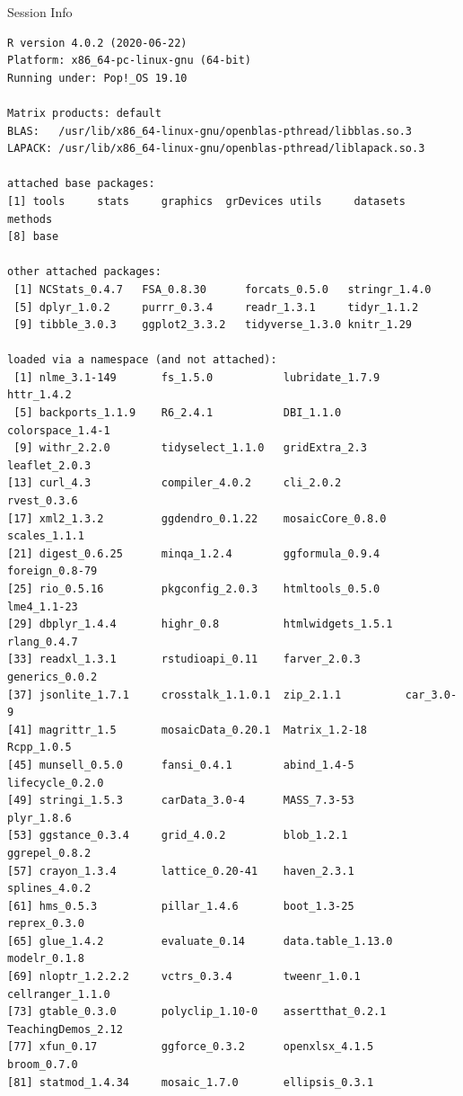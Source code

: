 \documentclass[10pt]{beamer}\usepackage[]{graphicx}\usepackage[]{color}
\makeatletter
\newenvironment{kframe}{%
 \def\at@end@of@kframe{}%
 \ifinner\ifhmode%
  \def\at@end@of@kframe{\end{minipage}}%
  \begin{minipage}{\columnwidth}%
 \fi\fi%
 \def\FrameCommand##1{\hskip\@totalleftmargin \hskip-\fboxsep
 \colorbox{shadecolor}{##1}\hskip-\fboxsep
     \hskip-\linewidth \hskip-\@totalleftmargin \hskip\columnwidth}%
 \MakeFramed {\advance\hsize-\width
   \@totalleftmargin\z@ \linewidth\hsize
   \@setminipage}}%
 {\par\unskip\endMakeFramed%
 \at@end@of@kframe}
\newenvironment{knitrout}{}{} %
\makeatother
\begin{document}
\begin{frame}[fragile]{Session Info}
	\tiny
	
\begin{knitrout}\tiny
{}\color{fgcolor}\begin{kframe}
\begin{verbatim}
R version 4.0.2 (2020-06-22)
Platform: x86_64-pc-linux-gnu (64-bit)
Running under: Pop!_OS 19.10

Matrix products: default
BLAS:   /usr/lib/x86_64-linux-gnu/openblas-pthread/libblas.so.3
LAPACK: /usr/lib/x86_64-linux-gnu/openblas-pthread/liblapack.so.3

attached base packages:
[1] tools     stats     graphics  grDevices utils     datasets  methods  
[8] base     

other attached packages:
 [1] NCStats_0.4.7   FSA_0.8.30      forcats_0.5.0   stringr_1.4.0  
 [5] dplyr_1.0.2     purrr_0.3.4     readr_1.3.1     tidyr_1.1.2    
 [9] tibble_3.0.3    ggplot2_3.3.2   tidyverse_1.3.0 knitr_1.29     

loaded via a namespace (and not attached):
 [1] nlme_3.1-149       fs_1.5.0           lubridate_1.7.9    httr_1.4.2        
 [5] backports_1.1.9    R6_2.4.1           DBI_1.1.0          colorspace_1.4-1  
 [9] withr_2.2.0        tidyselect_1.1.0   gridExtra_2.3      leaflet_2.0.3     
[13] curl_4.3           compiler_4.0.2     cli_2.0.2          rvest_0.3.6       
[17] xml2_1.3.2         ggdendro_0.1.22    mosaicCore_0.8.0   scales_1.1.1      
[21] digest_0.6.25      minqa_1.2.4        ggformula_0.9.4    foreign_0.8-79    
[25] rio_0.5.16         pkgconfig_2.0.3    htmltools_0.5.0    lme4_1.1-23       
[29] dbplyr_1.4.4       highr_0.8          htmlwidgets_1.5.1  rlang_0.4.7       
[33] readxl_1.3.1       rstudioapi_0.11    farver_2.0.3       generics_0.0.2    
[37] jsonlite_1.7.1     crosstalk_1.1.0.1  zip_2.1.1          car_3.0-9         
[41] magrittr_1.5       mosaicData_0.20.1  Matrix_1.2-18      Rcpp_1.0.5        
[45] munsell_0.5.0      fansi_0.4.1        abind_1.4-5        lifecycle_0.2.0   
[49] stringi_1.5.3      carData_3.0-4      MASS_7.3-53        plyr_1.8.6        
[53] ggstance_0.3.4     grid_4.0.2         blob_1.2.1         ggrepel_0.8.2     
[57] crayon_1.3.4       lattice_0.20-41    haven_2.3.1        splines_4.0.2     
[61] hms_0.5.3          pillar_1.4.6       boot_1.3-25        reprex_0.3.0      
[65] glue_1.4.2         evaluate_0.14      data.table_1.13.0  modelr_0.1.8      
[69] nloptr_1.2.2.2     vctrs_0.3.4        tweenr_1.0.1       cellranger_1.1.0  
[73] gtable_0.3.0       polyclip_1.10-0    assertthat_0.2.1   TeachingDemos_2.12
[77] xfun_0.17          ggforce_0.3.2      openxlsx_4.1.5     broom_0.7.0       
[81] statmod_1.4.34     mosaic_1.7.0       ellipsis_0.3.1    
\end{verbatim}
\end{kframe}
\end{knitrout}

\end{frame}
\end{document}
